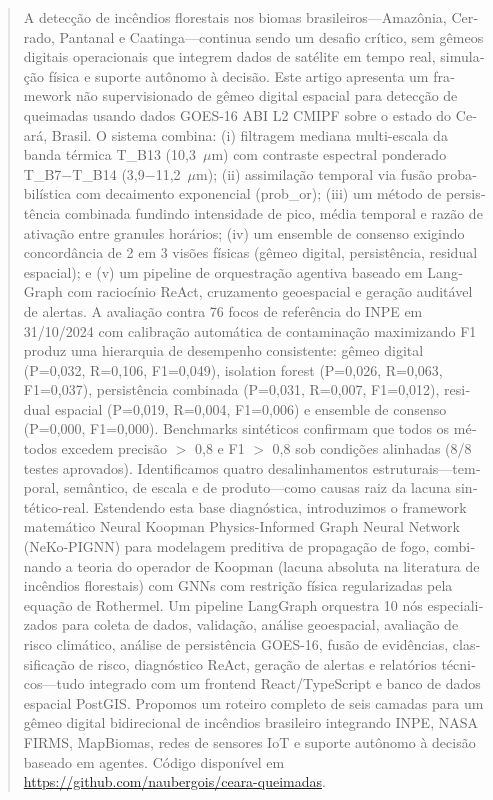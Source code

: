 \documentclass[5p,twocolumn]{elsarticle}
\begin{document}
\begin{otherlanguage}{portuguese}
\begin{abstract}
A detecção de incêndios florestais nos biomas brasileiros---Amazônia, Cerrado, Pantanal e Caatinga---continua sendo um desafio crítico, sem gêmeos digitais operacionais que integrem dados de satélite em tempo real, simulação física e suporte autônomo à decisão. Este artigo apresenta um framework não supervisionado de gêmeo digital espacial para detecção de queimadas usando dados GOES-16 ABI L2 CMIPF sobre o estado do Ceará, Brasil. O sistema combina: (i) filtragem mediana multi-escala da banda térmica T\_B13 (10,3~$\mu$m) com contraste espectral ponderado T\_B7$-$T\_B14 (3,9$-$11,2~$\mu$m); (ii) assimilação temporal via fusão probabilística com decaimento exponencial (prob\_or); (iii) um método de persistência combinada fundindo intensidade de pico, média temporal e razão de ativação entre granules horários; (iv) um ensemble de consenso exigindo concordância de 2 em 3 visões físicas (gêmeo digital, persistência, residual espacial); e (v) um pipeline de orquestração agentiva baseado em LangGraph com raciocínio ReAct, cruzamento geoespacial e geração auditável de alertas. A avaliação contra 76 focos de referência do INPE em 31/10/2024 com calibração automática de contaminação maximizando F1 produz uma hierarquia de desempenho consistente: gêmeo digital (P=0,032, R=0,106, F1=0,049), isolation forest (P=0,026, R=0,063, F1=0,037), persistência combinada (P=0,031, R=0,007, F1=0,012), residual espacial (P=0,019, R=0,004, F1=0,006) e ensemble de consenso (P=0,000, F1=0,000). Benchmarks sintéticos confirmam que todos os métodos excedem precisão $>$ 0,8 e F1 $>$ 0,8 sob condições alinhadas (8/8 testes aprovados). Identificamos quatro desalinhamentos estruturais---temporal, semântico, de escala e de produto---como causas raiz da lacuna sintético-real. Estendendo esta base diagnóstica, introduzimos o framework matemático Neural Koopman Physics-Informed Graph Neural Network (NeKo-PIGNN) para modelagem preditiva de propagação de fogo, combinando a teoria do operador de Koopman (lacuna absoluta na literatura de incêndios florestais) com GNNs com restrição física regularizadas pela equação de Rothermel. Um pipeline LangGraph orquestra 10 nós especializados para coleta de dados, validação, análise geoespacial, avaliação de risco climático, análise de persistência GOES-16, fusão de evidências, classificação de risco, diagnóstico ReAct, geração de alertas e relatórios técnicos---tudo integrado com um frontend React/TypeScript e banco de dados espacial PostGIS. Propomos um roteiro completo de seis camadas para um gêmeo digital bidirecional de incêndios brasileiro integrando INPE, NASA FIRMS, MapBiomas, redes de sensores IoT e suporte autônomo à decisão baseado em agentes.
Código disponível em \url{https://github.com/naubergois/ceara-queimadas}.\end{abstract}
\end{otherlanguage}
\end{document}
